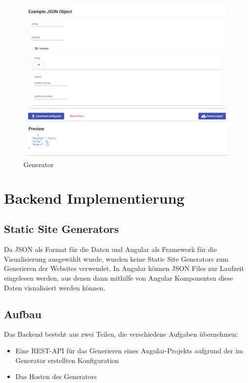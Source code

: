 \begin{figure}[hbt!]
    \centering
    \includegraphics[scale=.2]{pics/generator}
    \caption{Generator}
\end{figure}


\section{Backend Implementierung}

\subsection{Static Site Generators}
Da JSON als Format für die Daten und Angular als Framework für die Visualisierung ausgewählt wurde, wurden
keine Static Site Generators zum Generieren der Websites verwendet.
In Angular können JSON Files zur Laufzeit eingelesen werden, aus denen dann mithilfe von Angular Komponenten diese
Daten visualisiert werden können.

\subsection{Aufbau}
Das Backend besteht aus zwei Teilen, die verschiedene Aufgaben übernehmen:

\begin{itemize}
    \item Eine REST-API für das Generieren eines Angular-Projekts aufgrund der im Generator erstellten Konfiguration
    \item Das Hosten des Generators
\end{itemize}

